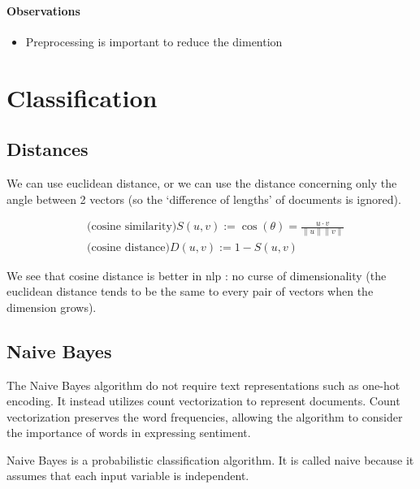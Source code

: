 \documentclass{article}
\begin{document}
\paragraph{Observations}
\begin{itemize}
  \item Preprocessing is important to reduce the dimention
\end{itemize}

\section{Classification}

\subsection{Distances}

We can use euclidean distance, or we can use the distance concerning
only the angle between 2 vectors (so the `difference of lengths' of documents
is ignored).

\begin{minipage}{\textwidth}
\begin{minipage}{0.49\textwidth}
$$
\begin{aligned}
&\text{(cosine similarity)}S(u, v) :=
\cos (\theta)=\frac{u \cdot v}{\|u\|\|v\|}\\
&\text{(cosine distance)}D(u, v) :=1-S(u, v)
\end{aligned}
$$
\end{minipage}
\centering
\begin{minipage}{0.49\textwidth}

\end{minipage}
\end{minipage}

We see that cosine distance is better in nlp : no curse of dimensionality (the euclidean
distance tends to be the same to every pair of vectors when the dimension grows).

\subsection{Naive Bayes}

The Naive Bayes algorithm do not require text representations such as one-hot encoding. It instead utilizes count vectorization to represent documents. Count vectorization preserves the word frequencies, allowing the algorithm to consider the importance of words in expressing sentiment.

Naive Bayes is a probabilistic classification algorithm.
It is called naive because it assumes that each input variable is independent.
\end{document}
